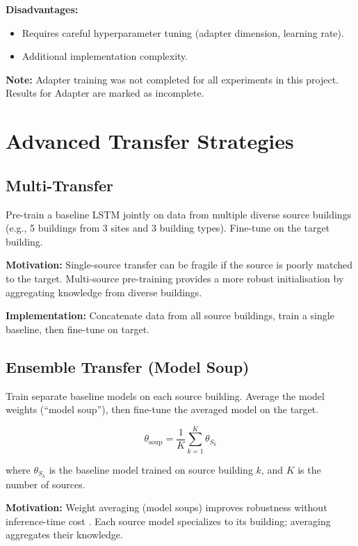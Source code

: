 \documentclass[12pt,a4paper]{report}
\begin{document}
\textbf{Disadvantages:}
\begin{itemize}
    \item Requires careful hyperparameter tuning (adapter dimension, learning rate).
    \item Additional implementation complexity.
\end{itemize}

\textbf{Note:} Adapter training was not completed for all experiments in this project. Results for Adapter are marked as incomplete.

\section{Advanced Transfer Strategies}

\subsection{Multi-Transfer}

Pre-train a baseline LSTM jointly on data from multiple diverse source buildings (e.g., 5 buildings from 3 sites and 3 building types). Fine-tune on the target building.

\textbf{Motivation:} Single-source transfer can be fragile if the source is poorly matched to the target. Multi-source pre-training provides a more robust initialisation by aggregating knowledge from diverse buildings.

\textbf{Implementation:} Concatenate data from all source buildings, train a single baseline, then fine-tune on target.

\subsection{Ensemble Transfer (Model Soup)}

Train separate baseline models on each source building. Average the model weights (``model soup''), then fine-tune the averaged model on the target.

\[
\theta_{\text{soup}} = \frac{1}{K} \sum_{k=1}^{K} \theta_{S_k}
\]

where \(\theta_{S_k}\) is the baseline model trained on source building \(k\), and \(K\) is the number of sources.

\textbf{Motivation:} Weight averaging (model soups) improves robustness without inference-time cost \cite{wortsman2022model}. Each source model specializes to its building; averaging aggregates their knowledge.
\end{document}
